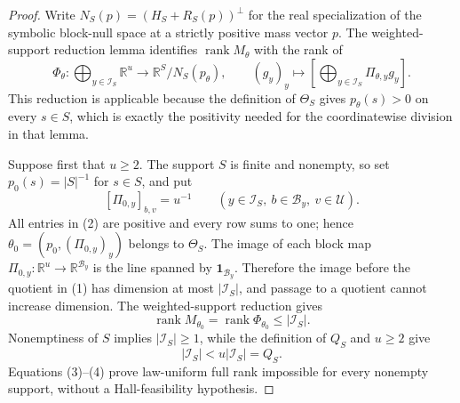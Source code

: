 \documentclass{article}
\begin{document}
\begin{proof}
Write \(N_S(p)=(H_S+R_S(p))^\perp\) for the real specialization of the symbolic block-null space at a strictly positive mass vector \(p\).  The weighted-support reduction lemma identifies \(\operatorname{rank}M_\theta\) with the rank of
\[
\Phi_\theta:\bigoplus_{y\in\mathcal I_S}\mathbb R^u
\longrightarrow \mathbb R^S/N_S(p_\theta),
\qquad
(g_y)_y\longmapsto
\left[\bigoplus_{y\in\mathcal I_S}\Pi_{\theta,y}g_y\right].
\tag{1}
\]
This reduction is applicable because the definition of \(\Theta_S\) gives \(p_\theta(s)>0\) on every \(s\in S\), which is exactly the positivity needed for the coordinatewise division in that lemma.

Suppose first that \(u\geq2\).  The support \(S\) is finite and nonempty, so set \(p_0(s)=|S|^{-1}\) for \(s\in S\), and put
\[
[\Pi_{0,y}]_{b,v}=u^{-1}
\qquad
(y\in\mathcal I_S,\ b\in\mathcal B_y,\ v\in\mathcal U).
\tag{2}
\]
All entries in (2) are positive and every row sums to one; hence \(\theta_0=(p_0,(\Pi_{0,y})_y)\) belongs to \(\Theta_S\).  The image of each block map \(\Pi_{0,y}:\mathbb R^u\to\mathbb R^{\mathcal B_y}\) is the line spanned by \(\mathbf1_{\mathcal B_y}\).  Therefore the image before the quotient in (1) has dimension at most \(|\mathcal I_S|\), and passage to a quotient cannot increase dimension.  The weighted-support reduction gives
\[
\operatorname{rank}M_{\theta_0}
=\operatorname{rank}\Phi_{\theta_0}
\leq |\mathcal I_S|.
\tag{3}
\]
Nonemptiness of \(S\) implies \(|\mathcal I_S|\geq1\), while the definition of \(Q_S\) and \(u\geq2\) give
\[
|\mathcal I_S|<u|\mathcal I_S|=Q_S.
\tag{4}
\]
Equations (3)--(4) prove law-uniform full rank impossible for every nonempty support, without a Hall-feasibility hypothesis.


\end{proof}
\end{document}
